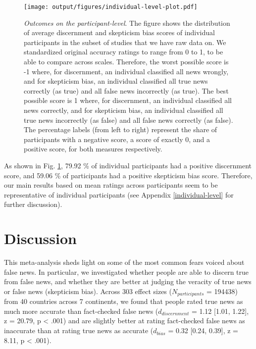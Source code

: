 \documentclass[
  man]{apa6}
\begin{document}
\begin{figure}
\centering
\texttt{[image: output/figures/individual-level-plot.pdf]}
\caption{\label{fig:individual-level-plot}\emph{Outcomes on the participant-level}. The figure shows the distribution of average discernment and skepticism bias scores of individual participants in the subset of studies that we have raw data on. We standardized original accuracy ratings to range from 0 to 1, to be able to compare across scales. Therefore, the worst possible score is -1 where, for discernment, an individual classified all news wrongly, and for skepticism bias, an individual classified all true news correctly (as true) and all false news incorrectly (as true). The best possible score is 1 where, for discernment, an individual classified all news correctly, and for skepticism bias, an individual classified all true news incorrectly (as false) and all false news correctly (as false). The percentage labels (from left to right) represent the share of participants with a negative score, a score of exactly 0, and a positive score, for both measures respectively.}
\end{figure}

As shown in Fig. \ref{fig:individual-level-plot}, 79.92 \% of individual participants had a positive discernment score, and 59.06 \% of participants had a positive skepticism bias score. Therefore, our main results based on mean ratings across participants seem to be representative of individual participants (see Appendix \ref{individual-level} for further discussion).

\section{Discussion}\label{discussion}

This meta-analysis sheds light on some of the most common fears voiced about false news. In particular, we investigated whether people are able to discern true from false news, and whether they are better at judging the veracity of true news or false news (skepticism bias). Across 303 effect sizes (\(N_{participants}\) = 194438) from 40 countries across 7 continents, we found that people rated true news as much more accurate than fact-checked false news (\(d_{discernment}\) = 1.12 {[}1.01, 1.22{]}, z = 20.79, p \textless{} .001) and are slightly better at rating fact-checked false news as inaccurate than at rating true news as accurate (\(d_{bias}\) = 0.32 {[}0.24, 0.39{]}, z = 8.11, p \textless{} .001).
\end{document}
